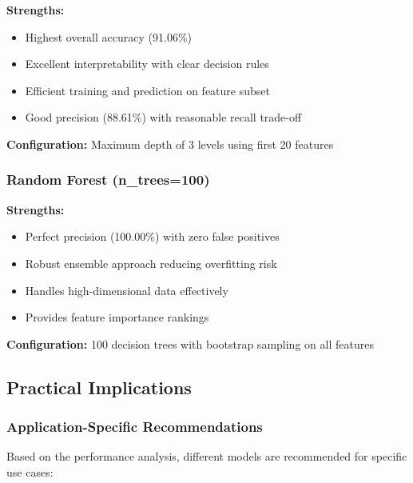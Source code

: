 \textbf{Strengths:}
\begin{itemize}
    \item Highest overall accuracy (91.06\%)
    \item Excellent interpretability with clear decision rules
    \item Efficient training and prediction on feature subset
    \item Good precision (88.61\%) with reasonable recall trade-off
\end{itemize}

\textbf{Configuration:} Maximum depth of 3 levels using first 20 features

\subsubsection{Random Forest (n\_trees=100)}

\textbf{Strengths:}
\begin{itemize}
    \item Perfect precision (100.00\%) with zero false positives
    \item Robust ensemble approach reducing overfitting risk
    \item Handles high-dimensional data effectively
    \item Provides feature importance rankings
\end{itemize}

\textbf{Configuration:} 100 decision trees with bootstrap sampling on all features

\subsection{Practical Implications}

\subsubsection{Application-Specific Recommendations}

Based on the performance analysis, different models are recommended for specific use cases:

